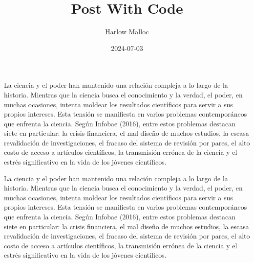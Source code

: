 \documentclass[
  latterpaper,
  DIV=11,
  numbers=noendperiod]{scrartcl}
\title{Post With Code}
\author{Harlow Malloc}
\date{2024-07-03}
\renewcommand*\contentsname{Tabla de contenidos}
\newcommand\contentsname{Tabla de contenidos}
\begin{document}
\maketitle

\renewcommand*\contentsname{Tabla de contenidos}
{
\hypersetup{linkcolor=}
\setcounter{tocdepth}{3}
\tableofcontents
}
La ciencia y el poder han mantenido una relación compleja a lo largo de
la historia. Mientras que la ciencia busca el conocimiento y la verdad,
el poder, en muchas ocasiones, intenta moldear los resultados
científicos para servir a sus propios intereses. Esta tensión se
manifiesta en varios problemas contemporáneos que enfrenta la ciencia.
Según Infobae (2016), entre estos problemas destacan siete en
particular: la crisis financiera, el mal diseño de muchos estudios, la
escasa revalidación de investigaciones, el fracaso del sistema de
revisión por pares, el alto costo de acceso a artículos científicos, la
transmisión errónea de la ciencia y el estrés significativo en la vida
de los jóvenes científicos.

\begin{tcolorbox}[enhanced jigsaw, colframe=quarto-callout-note-color-frame, toprule=.15mm, colbacktitle=quarto-callout-note-color!10!white, coltitle=black, bottomtitle=1mm, opacityback=0, toptitle=1mm, rightrule=.15mm, arc=.35mm, title=\textcolor{quarto-callout-note-color}{\faInfo}\hspace{0.5em}{Nota}, titlerule=0mm, breakable, colback=white, leftrule=.75mm, bottomrule=.15mm, left=2mm, opacitybacktitle=0.6]

La ciencia y el poder han mantenido una relación compleja a lo largo de
la historia. Mientras que la ciencia busca el conocimiento y la verdad,
el poder, en muchas ocasiones, intenta moldear los resultados
científicos para servir a sus propios intereses. Esta tensión se
manifiesta en varios problemas contemporáneos que enfrenta la ciencia.
Según Infobae (2016), entre estos problemas destacan siete en
particular: la crisis financiera, el mal diseño de muchos estudios, la
escasa revalidación de investigaciones, el fracaso del sistema de
revisión por pares, el alto costo de acceso a artículos científicos, la
transmisión errónea de la ciencia y el estrés significativo en la vida
de los jóvenes científicos.

\end{tcolorbox}
\end{document}
